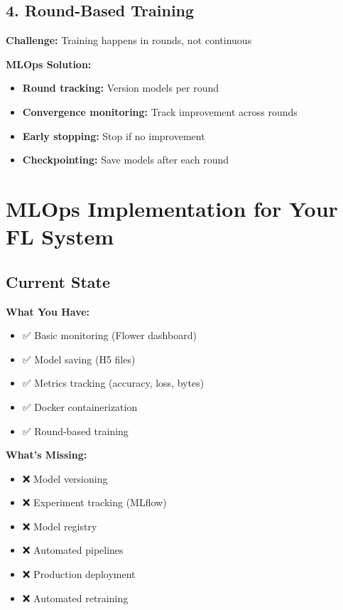\documentclass[12pt]{article}
\begin{document}
\subsection{4. Round-Based Training}

\textbf{Challenge:} Training happens in rounds, not continuous

\textbf{MLOps Solution:}
\begin{itemize}
    \item \textbf{Round tracking:} Version models per round
    \item \textbf{Convergence monitoring:} Track improvement across rounds
    \item \textbf{Early stopping:} Stop if no improvement
    \item \textbf{Checkpointing:} Save models after each round
\end{itemize}

\section{MLOps Implementation for Your FL System}

\subsection{Current State}

\textbf{What You Have:}
\begin{itemize}
    \item ✅ Basic monitoring (Flower dashboard)
    \item ✅ Model saving (H5 files)
    \item ✅ Metrics tracking (accuracy, loss, bytes)
    \item ✅ Docker containerization
    \item ✅ Round-based training
\end{itemize}

\textbf{What's Missing:}
\begin{itemize}
    \item ❌ Model versioning
    \item ❌ Experiment tracking (MLflow)
    \item ❌ Model registry
    \item ❌ Automated pipelines
    \item ❌ Production deployment
    \item ❌ Automated retraining
\end{itemize}
\end{document}

